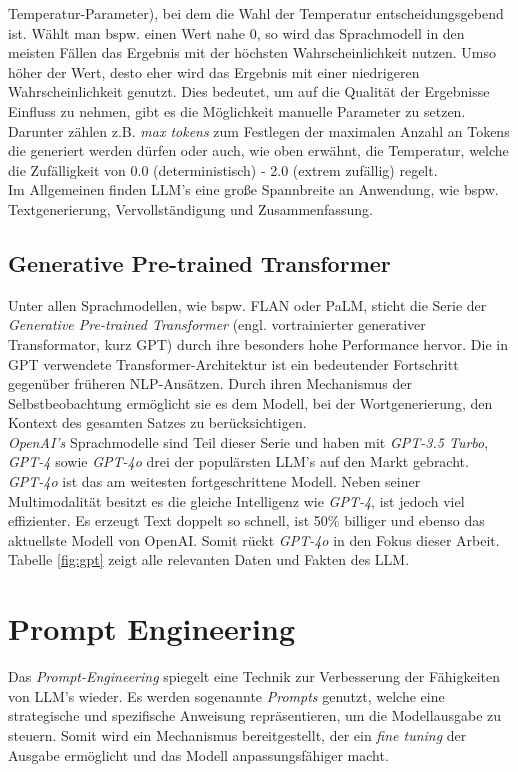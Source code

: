 Temperatur-Parameter), bei dem die Wahl der Temperatur entscheidungsgebend ist. Wählt man bspw. einen Wert nahe 0, so wird das Sprachmodell in den meisten Fällen das Ergebnis mit der höchsten Wahrscheinlichkeit nutzen. Umso höher der Wert, desto eher wird das Ergebnis mit einer niedrigeren Wahrscheinlichkeit genutzt. \cite*{WeightsBiases} Dies bedeutet, um auf die Qualität der Ergebnisse Einfluss zu nehmen, gibt es die Möglichkeit manuelle Parameter zu setzen. Darunter zählen z.B. \textit{max tokens} zum Festlegen der maximalen Anzahl an Tokens die generiert werden dürfen oder auch, wie oben erwähnt, die Temperatur, welche die Zufälligkeit von 0.0 (deterministisch) - 2.0 (extrem zufällig) regelt.\\ Im Allgemeinen finden LLM's eine große Spannbreite an Anwendung, wie bspw. Textgenerierung, Vervollständigung und Zusammenfassung. \cite*{dhadukHowLargeLanguage2023}

\subsection{Generative Pre-trained Transformer}\label{subsection:gpt}
Unter allen Sprachmodellen, wie bspw. FLAN oder PaLM, sticht die Serie der \textit{Generative Pre-trained Transformer} (engl. vortrainierter generativer Transformator, kurz GPT) durch ihre besonders hohe Performance hervor. \cite*{yeComprehensiveCapabilityAnalysis2023} Die in GPT verwendete Transformer-Architektur ist ein bedeutender Fortschritt gegenüber früheren \acs{NLP}-Ansätzen. Durch ihren Mechanismus der Selbstbeobachtung ermöglicht sie es dem Modell, bei der Wortgenerierung, den Kontext des gesamten Satzes zu berücksichtigen. \cite*{yenduriGenerativePretrainedTransformer2023} \\ \textit{OpenAI's} Sprachmodelle sind Teil dieser Serie und haben mit \textit{GPT-3.5 Turbo}, \textit{GPT-4} sowie \textit{GPT-4o} drei der populärsten LLM's auf den Markt gebracht. \cite*{yaoSurveyLargeLanguage2024}\\
\textit{GPT-4o} ist das am weitesten fortgeschrittene Modell. Neben seiner Multimodalität besitzt es die gleiche Intelligenz wie \textit{GPT-4}, ist jedoch viel effizienter. Es erzeugt Text doppelt so schnell, ist 50\% billiger und ebenso das aktuellste Modell von OpenAI. Somit rückt \textit{GPT-4o} in den Fokus dieser Arbeit. \cite*{OpenAIPlatform} Tabelle \ref{fig:gpt} zeigt alle relevanten Daten und Fakten des LLM.



\section{Prompt Engineering}
Das \textit{Prompt-Engineering} spiegelt eine Technik zur Verbesserung der Fähigkeiten von LLM's wieder. Es werden sogenannte \textit{Prompts} genutzt, welche eine strategische und spezifische Anweisung repräsentieren, um die Modellausgabe zu steuern. Somit wird ein Mechanismus bereitgestellt, der ein \textit{fine tuning} der Ausgabe ermöglicht und das Modell anpassungsfähiger macht. \cite*{sahooSystematicSurveyPrompt2024} 

